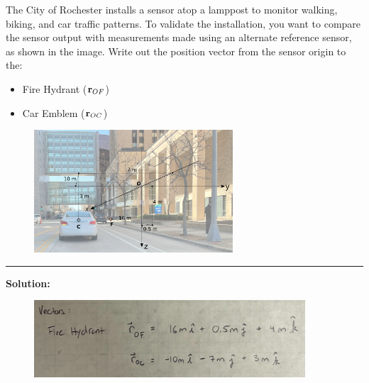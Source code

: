 
The City of Rochester installs a sensor atop a lamppost to monitor walking, biking, and car traffic patterns.  To validate the installation, you want to compare the sensor output with measurements made using an alternate reference sensor, as shown in the image.  Write out the position vector from the sensor origin to the:
\begin{itemize}
  \item Fire Hydrant (${\bf r}_{OF}$)
  \item Car Emblem (${\bf r}_{OC}$)
\end{itemize}

\begin{figure}[ht!]
  \centering
  \includegraphics[height=1.8in]{3d-street-buildings.png}
\end{figure}


\vspace{.5cm}
\rule{\textwidth}{.4pt}
\vspace{.5cm}
\textbf{Solution:}
\begin{figure}[ht!]
  \centering
  \includegraphics[width=0.9\textwidth]{soln.png}
\end{figure}

